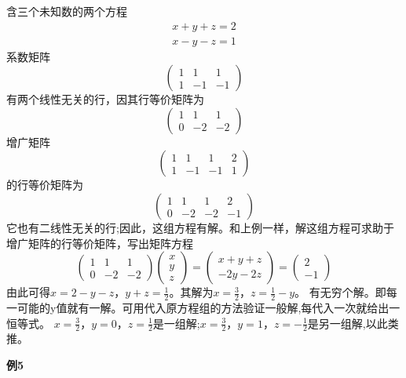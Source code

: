 含三个未知数的两个方程
\[
\begin{array}{c}
    x+y+z=2 \\ x-y-z=1
\end{array}
\]
系数矩阵
\[
\begin{pmatrix}
    1 & 1 & 1 \\
    1 & -1 & -1
\end{pmatrix}    
\]
有两个线性无关的行，因其行等价矩阵为
\[
\begin{pmatrix}
    1 & 1 & 1 \\
    0 & -2 & -2
\end{pmatrix}    
\]
增广矩阵
\[
\begin{pmatrix}
    1 & 1 & 1 & 2\\
    1 & -1 & -1 & 1
\end{pmatrix}    
\]
的行等价矩阵为
\[
\begin{pmatrix}
    1 & 1 & 1 & 2\\
    0 & -2 & -2 & -1
\end{pmatrix}    
\]
它也有二线性无关的行;因此，这组方程有解。和上例一样，解这组方程可求助于增广矩阵的行等价矩阵，写出矩阵方程
\[
\begin{pmatrix}
    1 & 1 & 1 \\
    0 & -2 & -2
\end{pmatrix}    
\begin{pmatrix}
    x \\ y \\ z
\end{pmatrix}   
=
\begin{pmatrix}
    x+y+z \\ -2y-2z
\end{pmatrix}  
=
\begin{pmatrix}
    2 \\ -1
\end{pmatrix} 
\]
由此可得$x=2-y-z$，$y+z=\frac{1}{2}$。其解为$x=\frac{3}{2}$，$z=\frac{1}{2}-y$。
有无穷个解。即每一可能的y值就有一解。可用代入原方程组的方法验证一般解,每代入一次就给出一恒等式。
$x=\frac{3}{2}$，$y=0$，$z=\frac{1}{2}$是一组解;$x=\frac{3}{2}$，$y=1$，$z=-\frac{1}{2}$是另一组解,以此类推。

\textbf{例5}

